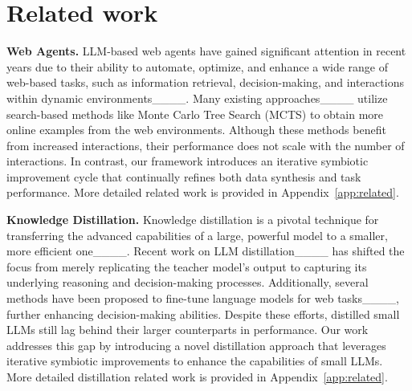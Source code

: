 \section{Related work}

    \textbf{Web Agents.} LLM-based web agents have gained significant attention in recent years due to their ability to automate, optimize, and enhance a wide range of web-based tasks, such as information retrieval, decision-making, and interactions within dynamic environments____.  Many existing approaches____
    utilize search-based methods like Monte Carlo Tree Search (MCTS) to obtain
    more online examples from the web environments. 
    Although these methods benefit from increased interactions, their performance does not scale with the number of interactions. In contrast, our framework introduces an iterative symbiotic improvement cycle that continually refines both data synthesis and task performance. More detailed related work is provided in Appendix~\ref{app:related}.

    \noindent\textbf{Knowledge Distillation.} Knowledge distillation is a pivotal technique for transferring the advanced capabilities of a large, powerful model to a smaller, more efficient one____. Recent work on LLM distillation____ has shifted the focus from merely replicating the teacher model’s output to capturing its underlying reasoning and decision-making processes. Additionally, several methods have been proposed to fine-tune language models for web tasks____, further enhancing decision-making abilities. Despite these efforts, distilled small LLMs still lag behind their larger counterparts in performance. Our work addresses this gap by introducing a novel distillation approach that leverages iterative symbiotic improvements to enhance the capabilities of small LLMs. More detailed distillation related work is provided in Appendix~\ref{app:related}.
